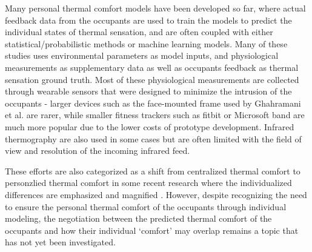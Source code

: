 Many personal thermal comfort models have been developed so far, where actual feedback data from the occupants are used to train the models to predict the individual states of thermal sensation, and are often coupled with either statistical/probabilistic methods \cite{daum_personalized_2011} or machine learning models. Many of these studies uses environmental parameters as model inputs, and physiological measurements \cite{ghahramani_online_2015} as supplementary data as well as occupants feedback as thermal sensation ground truth\cite{liu_personal_2019}. Most of these physiological measurements are collected through wearable sensors that were designed to minimize the intrusion of the occupants - larger devices such as the face-mounted frame used by Ghahramani et al. \cite{ghahramani_infrared_2016} are rarer, while smaller fitness trackers such as fitbit or Microsoft band\cite{li_personalized_2017} are much more popular due to the lower costs of prototype development. Infrared thermography are also used in some cases \cite{lu_thermal_2019} but are often limited with the field of view and resolution of the incoming infrared feed. 

These efforts are also categorized as a shift from centralized thermal comfort to personzlied thermal comfort in some recent research where the individualized differences are emphasized and magnified \cite{wang_individual_2018}. However, despite recognizing the need to ensure the personal thermal comfort of the occupants through individual modeling, the negotiation between the predicted thermal comfort of the occupants and how their individual `comfort' may overlap remains a topic that has not yet been investigated. 



